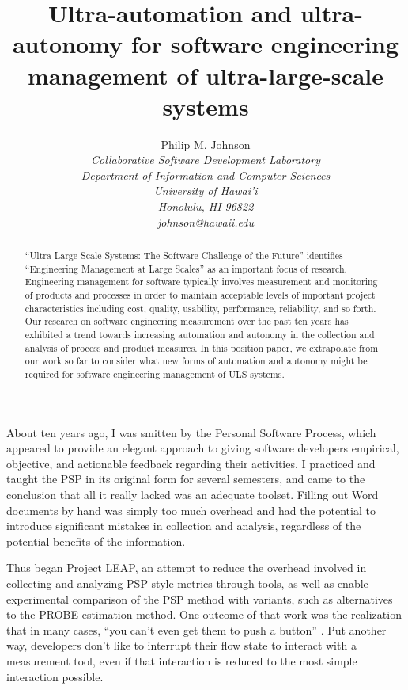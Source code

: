 \documentclass[10pt,twocolumn]{article}
\begin{document}
\title{Ultra-automation and ultra-autonomy for software engineering management of ultra-large-scale systems}

\author{Philip M. Johnson \\
\em  Collaborative Software Development Laboratory \\
\em  Department of Information and Computer Sciences \\
\em  University of Hawai'i \\
\em  Honolulu, HI 96822 \\
\em  johnson@hawaii.edu \\
}
\maketitle
\thispagestyle{empty}

\begin{abstract}
  ``Ultra-Large-Scale Systems: The Software Challenge of the Future''
  \cite{Northrup06} identifies ``Engineering Management at Large Scales'' as an important
  focus of research.  Engineering management for software typically
  involves measurement and monitoring of products and processes in order to
  maintain acceptable levels of important project characteristics including
  cost, quality, usability, performance, reliability, and so forth.  Our
  research on software engineering measurement over the past ten years has
  exhibited a trend towards increasing automation and autonomy in the
  collection and analysis of process and product measures.  In this
  position paper, we extrapolate from our work so far to consider what new
  forms of automation and autonomy might be required for software
  engineering management of ULS systems.
\end{abstract}


About ten years ago, I was smitten by the Personal Software
Process\cite{Humphrey95}, which appeared to provide an elegant approach to
giving software developers empirical, objective, and actionable feedback
regarding their activities.  I practiced and taught the PSP in its original
form for several semesters, and came to the conclusion that all it really
lacked was an adequate toolset.  Filling out Word documents by hand was
simply too much overhead and had the potential to introduce significant
mistakes in collection and analysis, regardless of the potential benefits
of the information\cite{csdl-98-13}.

Thus began Project LEAP, an attempt to reduce the overhead
involved in collecting and analyzing PSP-style metrics through tools, as
well as enable experimental comparison of the PSP method with variants,
such as alternatives to the PROBE estimation method.  One outcome of that
work was the realization that in many cases, ``you can't even get them to
push a button'' \cite{csdl2-01-12}. Put another way, developers don't like to interrupt their
flow state to interact with a measurement tool, even if that interaction is
reduced to the most simple interaction possible.
\end{document}
